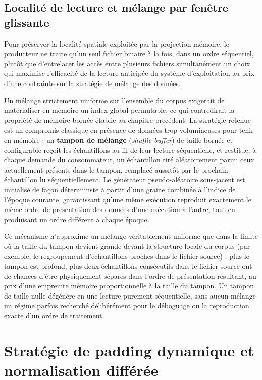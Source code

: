 \documentclass[12pt,a4paper]{report}
\begin{document}
\subsection{Localité de lecture et mélange par fenêtre glissante}

Pour préserver la localité spatiale exploitée par la projection mémoire, le producteur ne traite qu'un seul fichier binaire à la fois, dans un ordre séquentiel, plutôt que d'entrelacer les accès entre plusieurs fichiers simultanément un choix qui maximise l'efficacité de la lecture anticipée du système d'exploitation au prix d'une contrainte sur la stratégie de mélange des données.

Un mélange strictement uniforme sur l'ensemble du corpus exigerait de matérialiser en mémoire un index global permutable, ce qui contredirait la propriété de mémoire bornée établie au chapitre précédent. La stratégie retenue est un compromis classique en présence de données trop volumineuses pour tenir en mémoire : un \textbf{tampon de mélange} (\textit{shuffle buffer}) de taille bornée et configurable reçoit les échantillons au fil de leur lecture séquentielle, et restitue, à chaque demande du consommateur, un échantillon tiré aléatoirement parmi ceux actuellement présents dans le tampon, remplacé aussitôt par le prochain échantillon lu séquentiellement. Le générateur pseudo-aléatoire sous-jacent est initialisé de façon déterministe à partir d'une graine combinée à l'indice de l'époque courante, garantissant qu'une même exécution reproduit exactement le même ordre de présentation des données d'une exécution à l'autre, tout en produisant un ordre différent à chaque époque.

Ce mécanisme n'approxime un mélange véritablement uniforme que dans la limite où la taille du tampon devient grande devant la structure locale du corpus (par exemple, le regroupement d'échantillons proches dans le fichier source) : plus le tampon est profond, plus deux échantillons consécutifs dans le fichier source ont de chances d'être physiquement séparés dans l'ordre de présentation résultant, au prix d'une empreinte mémoire proportionnelle à la taille du tampon. Un tampon de taille nulle dégénère en une lecture purement séquentielle, sans aucun mélange un régime parfois recherché délibérément pour le déboguage ou la reproduction exacte d'un ordre de traitement.

\section{Stratégie de padding dynamique et normalisation différée}
\label{sec:padding_dynamique}
\end{document}
